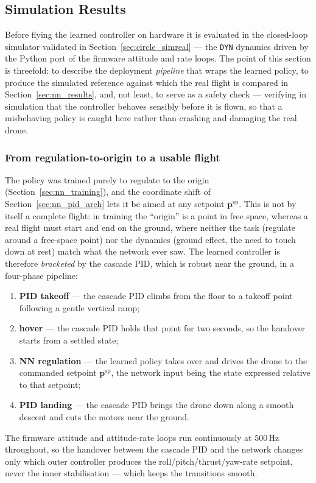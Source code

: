 \documentclass[11pt,a4paper]{article}
\theoremstyle{remark}
\numberwithin{equation}{section}
\begin{document}
\subsection{Simulation Results}\label{sec:nn_sim_results}

Before flying the learned controller on hardware it is evaluated in the
closed-loop simulator validated in Section~\ref{sec:circle_simreal} --- the
\texttt{DYN} dynamics driven by the Python port of the firmware attitude and
rate loops. The point of this section is threefold: to describe the deployment
\emph{pipeline} that wraps the learned policy, to produce the simulated
reference against which the real flight is compared in
Section~\ref{sec:nn_results}, and, not least, to serve as a safety check ---
verifying in simulation that the controller behaves sensibly before it is flown,
so that a misbehaving policy is caught here rather than crashing and damaging the
real drone.

\subsubsection*{From regulation-to-origin to a usable flight}

The policy was trained purely to regulate to the origin
(Section~\ref{sec:nn_training}), and the coordinate shift of
Section~\ref{sec:nn_pid_arch} lets it be aimed at any setpoint
$\mathbf{p}^{\mathrm{sp}}$. This is not by itself a complete flight: in
training the ``origin'' is a point in free space, whereas a real flight must
start and end on the ground, where neither the task (regulate around a
free-space point) nor the dynamics (ground effect, the need to touch down at
rest) match what the network ever saw. The learned controller is therefore
\emph{bracketed} by the cascade PID, which is robust near the ground, in a
four-phase pipeline:
\begin{enumerate}
    \item \textbf{PID takeoff} --- the cascade PID climbs from the floor to a
    takeoff point following a gentle vertical ramp;
    \item \textbf{hover} --- the cascade PID holds that point for two seconds,
    so the handover starts from a settled state;
    \item \textbf{NN regulation} --- the learned policy takes over and drives
    the drone to the commanded setpoint $\mathbf{p}^{\mathrm{sp}}$, the network
    input being the state expressed relative to that setpoint;
    \item \textbf{PID landing} --- the cascade PID brings the drone down along a
    smooth descent and cuts the motors near the ground.
\end{enumerate}
The firmware attitude and attitude-rate loops run continuously at
$500\,\mathrm{Hz}$ throughout, so the handover between the cascade PID and the
network changes only which outer controller produces the
roll/pitch/thrust/yaw-rate setpoint, never the inner stabilisation --- which
keeps the transitions smooth.
\end{document}
